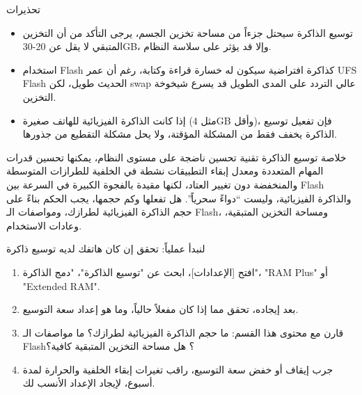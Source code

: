 \begin{tcbwarn}{تحذيرات}
\begin{itemize}
  \item توسيع الذاكرة سيحتل جزءاً من مساحة تخزين الجسم، يرجى التأكد من أن التخزين المتبقي لا يقل عن 20-30GB، وإلا قد يؤثر على سلاسة النظام.
  \item استخدام Flash كذاكرة افتراضية سيكون له خسارة قراءة وكتابة، رغم أن عمر UFS Flash الحديث طويل، لكن swap عالي التردد على المدى الطويل قد يسرع شيخوخة التخزين.
  \item إذا كانت الذاكرة الفيزيائية للهاتف صغيرة (مثل 4GB وأقل)، فإن تفعيل توسيع الذاكرة يخفف فقط من المشكلة المؤقتة، ولا يحل مشكلة التقطيع من جذورها.
\end{itemize}

\end{tcbwarn}

\begin{tcbinfo}{خلاصة}
توسيع الذاكرة تقنية تحسين ناضجة على مستوى النظام، يمكنها تحسين قدرات المهام المتعددة ومعدل إبقاء التطبيقات نشطة في الخلفية للطرازات المتوسطة والمنخفضة دون تغيير العتاد، لكنها مقيدة بالفجوة الكبيرة في السرعة بين Flash والذاكرة الفيزيائية، وليست “دواءً سحرياً”. هل تفعلها وكم حجمها، يجب الحكم بناءً على حجم الذاكرة الفيزيائية لطرازك، ومواصفات الـ Flash، ومساحة التخزين المتبقية، وعادات الاستخدام.

\end{tcbinfo}

\begin{tcbpractice}{لنبدأ عملياً: تحقق إن كان هاتفك لديه توسيع ذاكرة}
\begin{enumerate}
  \item افتح [الإعدادات]، ابحث عن "توسيع الذاكرة"، "دمج الذاكرة"، "RAM Plus" أو "Extended RAM".
  \item بعد إيجاده، تحقق مما إذا كان مفعلاً حالياً، وما هو إعداد سعة التوسيع.
  \item قارن مع محتوى هذا القسم: ما حجم الذاكرة الفيزيائية لطرازك؟ ما مواصفات الـ Flash؟ هل مساحة التخزين المتبقية كافية؟
  \item جرب إيقاف أو خفض سعة التوسيع، راقب تغيرات إبقاء الخلفية والحرارة لمدة أسبوع، لإيجاد الإعداد الأنسب لك.
\end{enumerate}

\end{tcbpractice}
